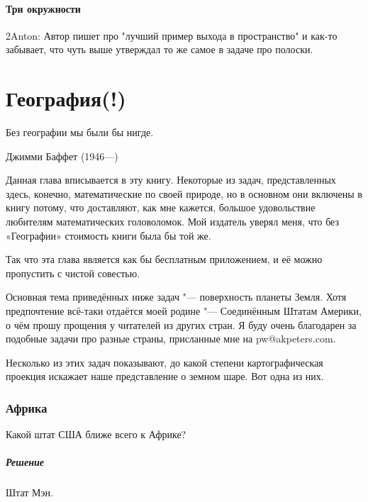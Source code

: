 \documentclass[twoside]{book}
\makeatletter
\newcommand{\rindex}[2][\imki@jobname]{%
  \index[#1]{\detokenize{#2}}%
}
\makeatother
\begin{document}
\subsubsection{Три окружности}
2Anton: Автор пишет про "лучший пример выхода в пространство" и как-то забывает, 
что чуть выше утверждал то же самое в задаче про полоски.



\chapter{География(!)}

\setlength{\epigraphwidth}{.4\textwidth}
\epigraph{Без географии мы были бы нигде.\vspace{1ex}}{Джимми Баффет (1946---)} 

Данная глава  вписывается в эту книгу.
Некоторые из задач, представленных здесь, конечно, математические по своей природе, %
но в основном они включены в книгу потому, что доставляют, как мне кажется, большое удовольствие любителям математических головоломок.
Мой издатель уверял меня, что без «Географии» стоимость книги была бы той же.

Так что эта глава является как бы бесплатным приложением, и её можно пропустить с чистой совестью.

Основная тема приведённых ниже задач "--- поверхность планеты Земля.
Хотя предпочтение всё-таки отдаётся моей родине "--- Соединённым Штатам Америки, о чём прошу прощения у читателей из других стран.
Я буду очень благодарен за подобные задачи про разные страны, присланные мне на pw@akpeters.com.

Несколько из этих задач показывают, до какой степени %
картографическая проекция %
искажает наше представление о земном шаре. %
Вот одна из них. 

\subsection*{Африка}
\rindex{Африка}

Какой штат США ближе всего к Африке? 

\paragraph{Решение} Штат Мэн.\heart
  
\end{document}

